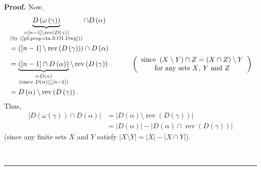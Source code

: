 \documentclass[numbers=enddot,12pt,final,onecolumn,notitlepage]{scrartcl}%
\theoremstyle{definition}
\newenvironment{proof}[1][Proof]{\noindent\textbf{#1.} }{\ \rule{0.5em}{0.5em}}
\newenvironment{noncompile}{}{}
\begin{document}
\begin{proof}
\begin{noncompile}
Now,%
\begin{align*}
&  \underbrace{D\left(  \omega\left(  \gamma\right)  \right)  }%
_{\substack{=\left[  n-1\right]  \setminus\operatorname*{rev}\left(  D\left(
\gamma\right)  \right)  \\\text{(by (\ref{pf.prop.eta.S.O1.Dwg}))}}}\cap
D\left(  \alpha\right) \\
&  =\left(  \left[  n-1\right]  \setminus\operatorname*{rev}\left(  D\left(
\gamma\right)  \right)  \right)  \cap D\left(  \alpha\right) \\
&  =\underbrace{\left(  \left[  n-1\right]  \cap D\left(  \alpha\right)
\right)  }_{\substack{=D\left(  \alpha\right)  \\\text{(since }D\left(
\alpha\right)  \subseteq\left[  n-1\right]  \text{)}}}\setminus
\operatorname*{rev}\left(  D\left(  \gamma\right)  \right)
\ \ \ \ \ \ \ \ \ \ \left(
\begin{array}
[c]{c}%
\text{since }\left(  X\setminus Y\right)  \cap Z=\left(  X\cap Z\right)
\setminus Y\\
\text{for any sets }X\text{, }Y\text{ and }Z
\end{array}
\right) \\
&  =D\left(  \alpha\right)  \setminus\operatorname*{rev}\left(  D\left(
\gamma\right)  \right)  .
\end{align*}
Thus,%
\begin{align}
\left\vert D\left(  \omega\left(  \gamma\right)  \right)  \cap D\left(
\alpha\right)  \right\vert  &  =\left\vert D\left(  \alpha\right)
\setminus\operatorname*{rev}\left(  D\left(  \gamma\right)  \right)
\right\vert \nonumber\\
&  =\left\vert D\left(  \alpha\right)  \right\vert -\left\vert D\left(
\alpha\right)  \cap\operatorname*{rev}\left(  D\left(  \gamma\right)  \right)
\right\vert \label{pf.prop.eta.S.O1.3}%
\end{align}
(since any finite sets $X$ and $Y$ satisfy $\left\vert X\setminus Y\right\vert
=\left\vert X\right\vert -\left\vert X\cap Y\right\vert $).


\end{noncompile}
\end{proof}
\end{document}

